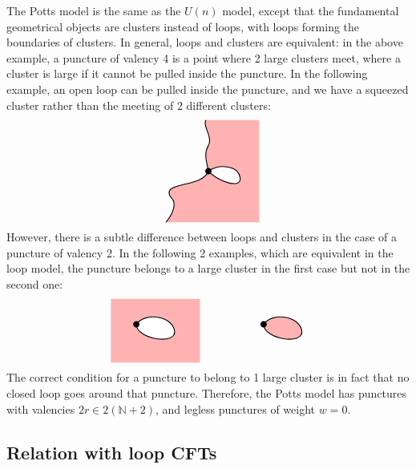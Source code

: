 \documentclass[12pt, a4paper]{article}
\theoremstyle{break}
\begin{document}
The Potts model is the same as the $U(n)$ model, except that the fundamental geometrical objects are clusters instead of loops, with loops forming the boundaries of clusters. In general, loops and clusters are equivalent: in the above example, a puncture of valency 4 is a point where 2 large clusters meet, where a cluster is large if it cannot be pulled inside the puncture. In the following example, an open loop can be pulled inside the puncture, and we have a squeezed cluster rather than the meeting of 2 different clusters:
\begin{align}
 \begin{tikzpicture}[baseline=(current  bounding  box.center), scale = .4]
  \clip (-4, -4) rectangle (4, 4);
  \filldraw[thick, fill = red!30] (0, 0) to [out = 100, in = -120] (0, 2) to [out = 60, in = -150] (0, 4.2) -- (4.2, 4.2) -- (4.2, -4.2) -- (-3.5, -4.2) to [out = 50, in = -40] (-3, -2) to [out = 120, in = -110] (0, 0) to [out = -50, in = -80] (2.5, -.5) to [out = 100, in = 35] (0, 0);
   \draw (0, 0) node[fill, circle, minimum size = 2mm, inner sep = 0]{};
 \end{tikzpicture}
\end{align}
However, there is a subtle difference between loops and clusters in the case of a puncture of valency 2. In the following 2 examples, which are equivalent in the loop model, the puncture belongs to a large cluster in the first case but not in the second one: 
\begin{align}
 \begin{tikzpicture}[baseline=(current  bounding  box.center), scale = .4]
  \fill[red!30] (-2, -3) rectangle (5, 2);
  \filldraw[thick, fill = white] (0, 0) to [out = -90, in = -80] (3, -.5) to [out = 100, in = 55] (0, 0);
   \draw (0, 0) node[fill, circle, minimum size = 2mm, inner sep = 0]{};
   \filldraw[thick, fill = red!30] (10, 0) to [out = -90, in = -80] (13, -.5) to [out = 100, in = 55] (10, 0);
   \draw (10, 0) node[fill, circle, minimum size = 2mm, inner sep = 0]{};
 \end{tikzpicture}
\end{align}
The correct condition for a puncture to belong to 1 large cluster is in fact that no closed loop goes around that puncture. 
Therefore, the Potts model has punctures with valencies $2r\in 2(\mathbb{N}+2)$, and legless punctures of weight $w=0$.


\subsection{Relation with loop CFTs}
\end{document}

